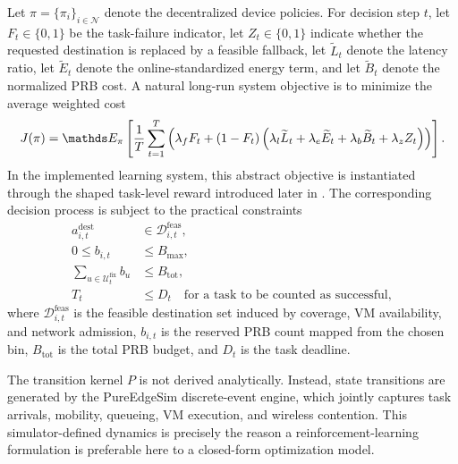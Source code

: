 Let \(\pi = \{\pi_i\}_{i \in \mathcal{N}}\) denote the decentralized device policies. For decision step \(t\), let \(F_t \in \{0,1\}\) be the task-failure indicator, let \(Z_t \in \{0,1\}\) indicate whether the requested destination is replaced by a feasible fallback, let \(\widetilde{L}_t\) denote the latency ratio, let \(\widetilde{E}_t\) denote the online-standardized energy term, and let \(\widetilde{B}_t\) denote the normalized PRB cost. A natural long-run system objective is to minimize the average weighted cost
\begin{align}
J(\pi) = \E_{\pi} \left[\frac{1}{T}\sum_{t=1}^{T}
\left(\lambda_f F_t + (1-F_t)\left(\lambda_l \widetilde{L}_t + \lambda_e \widetilde{E}_t
+ \lambda_b \widetilde{B}_t + \lambda_z Z_t\right)\right)\right].
\label{eq:policy-objective}
\end{align}
In the implemented learning system, this abstract objective is instantiated through the shaped task-level reward introduced later in . The corresponding decision process is subject to the practical constraints
\begin{align*}
a_{i,t}^{\mathrm{dest}} &\in \mathcal{D}_{i,t}^{\mathrm{feas}}, \\
0 \le b_{i,t} &\le B_{\max}, \\
\sum_{u \in \mathcal{U}_t^{\mathrm{fix}}} b_u &\le B_{\mathrm{tot}}, \\
T_t &\le D_t \quad \text{for a task to be counted as successful},
\end{align*}
where \(\mathcal{D}_{i,t}^{\mathrm{feas}}\) is the feasible destination set induced by coverage, VM availability, and network admission, \(b_{i,t}\) is the reserved PRB count mapped from the chosen bin, \(B_{\mathrm{tot}}\) is the total PRB budget, and \(D_t\) is the task deadline.

The transition kernel \(P\) is not derived analytically. Instead, state transitions are generated by the PureEdgeSim discrete-event engine, which jointly captures task arrivals, mobility, queueing, VM execution, and wireless contention. This simulator-defined dynamics is precisely the reason a reinforcement-learning formulation is preferable here to a closed-form optimization model.
